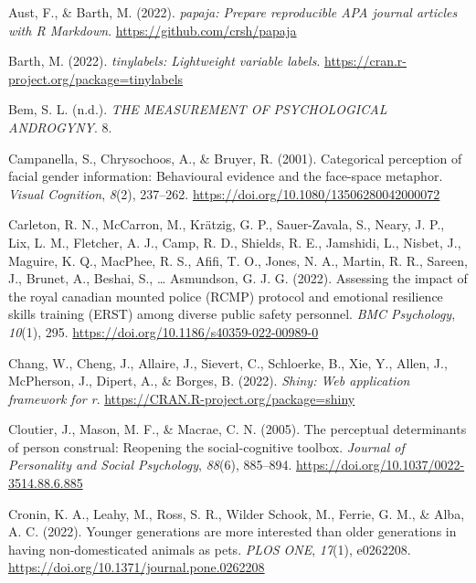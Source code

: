 \documentclass[
  man]{apa7}
\newlength{\cslhangindent}
\newlength{\cslentryspacingunit} %
\newenvironment{CSLReferences}[2] %
 {%
  \setlength{\parindent}{0pt}
  \ifodd #1
  \let\oldpar\par
  \def\par{\hangindent=\cslhangindent\oldpar}
  \fi
  \setlength{\parskip}{#2\cslentryspacingunit}
 }%
 {}
\begin{document}
\hypertarget{refs}{}
\begin{CSLReferences}{1}{0}
\leavevmode{}%
Aust, F., \& Barth, M. (2022). \emph{{papaja}: {Prepare} reproducible {APA} journal articles with {R Markdown}}. \url{https://github.com/crsh/papaja}

\leavevmode{}%
Barth, M. (2022). \emph{{tinylabels}: Lightweight variable labels}. \url{https://cran.r-project.org/package=tinylabels}

\leavevmode{}%
Bem, S. L. (n.d.). \emph{{THE} {MEASUREMENT} {OF} {PSYCHOLOGICAL} {ANDROGYNY}}. 8.

\leavevmode{}%
Campanella, S., Chrysochoos, A., \& Bruyer, R. (2001). Categorical perception of facial gender information: Behavioural evidence and the face-space metaphor. \emph{Visual Cognition}, \emph{8}(2), 237--262. \url{https://doi.org/10.1080/13506280042000072}

\leavevmode{}%
Carleton, R. N., McCarron, M., Krätzig, G. P., Sauer-Zavala, S., Neary, J. P., Lix, L. M., Fletcher, A. J., Camp, R. D., Shields, R. E., Jamshidi, L., Nisbet, J., Maguire, K. Q., MacPhee, R. S., Afifi, T. O., Jones, N. A., Martin, R. R., Sareen, J., Brunet, A., Beshai, S., \ldots{} Asmundson, G. J. G. (2022). Assessing the impact of the royal canadian mounted police ({RCMP}) protocol and emotional resilience skills training ({ERST}) among diverse public safety personnel. \emph{{BMC} Psychology}, \emph{10}(1), 295. \url{https://doi.org/10.1186/s40359-022-00989-0}

\leavevmode{}%
Chang, W., Cheng, J., Allaire, J., Sievert, C., Schloerke, B., Xie, Y., Allen, J., McPherson, J., Dipert, A., \& Borges, B. (2022). \emph{Shiny: Web application framework for r}. \url{https://CRAN.R-project.org/package=shiny}

\leavevmode{}%
Cloutier, J., Mason, M. F., \& Macrae, C. N. (2005). The perceptual determinants of person construal: Reopening the social-cognitive toolbox. \emph{Journal of Personality and Social Psychology}, \emph{88}(6), 885--894. \url{https://doi.org/10.1037/0022-3514.88.6.885}

\leavevmode{}%
Cronin, K. A., Leahy, M., Ross, S. R., Wilder Schook, M., Ferrie, G. M., \& Alba, A. C. (2022). Younger generations are more interested than older generations in having non-domesticated animals as pets. \emph{{PLOS} {ONE}}, \emph{17}(1), e0262208. \url{https://doi.org/10.1371/journal.pone.0262208}


\end{CSLReferences}
\end{document}
